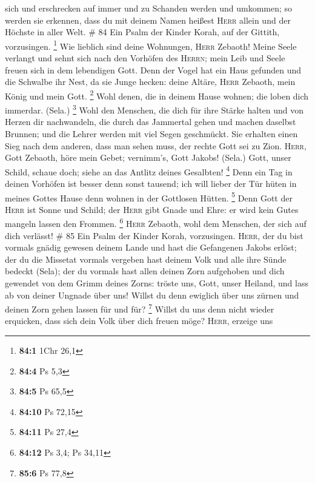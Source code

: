 sich und erschrecken auf immer und zu Schanden werden und umkommen;
 so werden sie erkennen, dass du mit deinem Namen heißest
\textsc{Herr} allein und der Höchste in aller Welt. \# 84 
Ein Psalm der Kinder Korah, auf der Gittith, vorzusingen. \footnote{\textbf{84:1}
  1Chr 26,1}  Wie lieblich sind deine Wohnungen,
\textsc{Herr} Zebaoth!  Meine Seele verlangt und sehnt
sich nach den Vorhöfen des \textsc{Herrn}; mein Leib und Seele freuen
sich in dem lebendigen Gott.  Denn der Vogel hat ein Haus
gefunden und die Schwalbe ihr Nest, da sie Junge hecken: deine Altäre,
\textsc{Herr} Zebaoth, mein König und mein Gott. \footnote{\textbf{84:4}
  Ps 5,3}  Wohl denen, die in deinem Hause wohnen; die
loben dich immerdar. (Sela.) \footnote{\textbf{84:5} Ps 65,5}
 Wohl den Menschen, die dich für ihre Stärke halten und
von Herzen dir nachwandeln,  die durch das Jammertal gehen
und machen daselbst Brunnen; und die Lehrer werden mit viel Segen
geschmückt.  Sie erhalten einen Sieg nach dem anderen,
dass man sehen muss, der rechte Gott sei zu Zion. 
\textsc{Herr}, Gott Zebaoth, höre mein Gebet; vernimm's, Gott Jakobs!
(Sela.)  Gott, unser Schild, schaue doch; siehe an das
Antlitz deines Gesalbten! \footnote{\textbf{84:10} Ps 72,15}
 Denn ein Tag in deinen Vorhöfen ist besser denn sonst
tausend; ich will lieber der Tür hüten in meines Gottes Hause denn
wohnen in der Gottlosen Hütten. \footnote{\textbf{84:11} Ps 27,4}
 Denn Gott der \textsc{Herr} ist Sonne und Schild; der
\textsc{Herr} gibt Gnade und Ehre: er wird kein Gutes mangeln lassen den
Frommen. \footnote{\textbf{84:12} Ps 3,4; Ps 34,11} 
\textsc{Herr} Zebaoth, wohl dem Menschen, der sich auf dich verlässt! \#
85  Ein Psalm der Kinder Korah, vorzusingen.
 \textsc{Herr}, der du bist vormals gnädig gewesen deinem
Lande und hast die Gefangenen Jakobs erlöst;  der du die
Missetat vormals vergeben hast deinem Volk und alle ihre Sünde bedeckt
(Sela);  der du vormals hast allen deinen Zorn aufgehoben
und dich gewendet von dem Grimm deines Zorns:  tröste uns,
Gott, unser Heiland, und lass ab von deiner Ungnade über uns!
 Willst du denn ewiglich über uns zürnen und deinen Zorn
gehen lassen für und für? \footnote{\textbf{85:6} Ps 77,8}
 Willst du uns denn nicht wieder erquicken, dass sich dein
Volk über dich freuen möge?  \textsc{Herr}, erzeige uns
